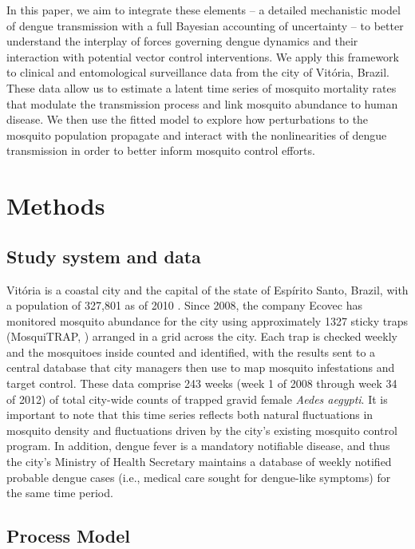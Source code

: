 \documentclass[10pt,letterpaper]{article}
\begin{document}
In this paper, we aim to integrate these elements -- a detailed mechanistic model of dengue transmission with a full Bayesian accounting of uncertainty --  to better understand the interplay of forces governing dengue dynamics and their interaction with potential vector control interventions.
We apply this framework to clinical and entomological surveillance data from the city of Vit\'oria, Brazil.
These data allow us to estimate a latent time series of mosquito mortality rates that modulate the transmission process and link mosquito abundance to human disease.  
We then use the fitted model to explore how perturbations to the mosquito population propagate and interact with the nonlinearities of dengue transmission in order to better inform mosquito control efforts.

\section*{Methods}

\subsection*{Study system and data}

Vit\'oria is a coastal city and the capital of the state of Esp\'irito Santo, Brazil, with a population of 327,801 as of 2010 \cite{vitpop}.
Since 2008, the company Ecovec has monitored mosquito abundance for the city using approximately 1327 sticky traps (MosquiTRAP, \cite{Eiras2009}) arranged in a grid across the city.
Each trap is checked weekly and the mosquitoes inside counted and identified, with the results sent to a central database that city managers then use to map mosquito infestations and target control.
These data comprise 243 weeks (week 1 of 2008 through week 34 of 2012) of total city-wide counts of trapped gravid female \emph{Aedes aegypti}.
It is important to note that this time series reflects both natural fluctuations in mosquito density and fluctuations driven by the city's existing mosquito control program.
In addition, dengue fever is a mandatory notifiable disease, and thus the city's Ministry of Health Secretary maintains a database of weekly notified probable dengue cases (i.e., medical care sought for dengue-like symptoms) for the same time period.

\subsection*{Process Model}
\end{document}
